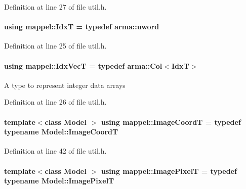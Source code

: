 Definition at line 27 of file util.\+h.

\paragraph[{\texorpdfstring{IdxT}{IdxT}}]{\setlength{\rightskip}{0pt plus 5cm}using {\bf mappel\+::\+IdxT} = typedef arma\+::uword}\hypertarget{namespacemappel_ab17ec0f30b61ece292439d7ece81d3a8}{}\label{namespacemappel_ab17ec0f30b61ece292439d7ece81d3a8}


Definition at line 25 of file util.\+h.

\paragraph[{\texorpdfstring{Idx\+VecT}{IdxVecT}}]{\setlength{\rightskip}{0pt plus 5cm}using {\bf mappel\+::\+Idx\+VecT} = typedef arma\+::\+Col$<${\bf IdxT}$>$}\hypertarget{namespacemappel_ac63743dcd42180127307cd0e4ecdd784}{}\label{namespacemappel_ac63743dcd42180127307cd0e4ecdd784}
A type to represent integer data arrays 

Definition at line 26 of file util.\+h.

\paragraph[{\texorpdfstring{Image\+CoordT}{ImageCoordT}}]{\setlength{\rightskip}{0pt plus 5cm}template$<$class Model $>$ using {\bf mappel\+::\+Image\+CoordT} = typedef typename Model\+::\+Image\+CoordT}\hypertarget{namespacemappel_a3ca6340183a2876d6bb6da936f1b667d}{}\label{namespacemappel_a3ca6340183a2876d6bb6da936f1b667d}


Definition at line 42 of file util.\+h.

\paragraph[{\texorpdfstring{Image\+PixelT}{ImagePixelT}}]{\setlength{\rightskip}{0pt plus 5cm}template$<$class Model $>$ using {\bf mappel\+::\+Image\+PixelT} = typedef typename Model\+::\+Image\+PixelT}\hypertarget{namespacemappel_a0b957a712590555ab00a1d0617a7f66f}{}\label{namespacemappel_a0b957a712590555ab00a1d0617a7f66f}


